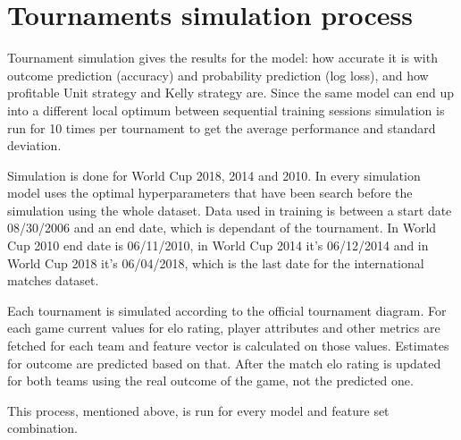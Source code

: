 \section{Tournaments simulation process}
Tournament simulation gives the results for the model: how accurate it is with outcome prediction (accuracy) and probability prediction (log loss), and how profitable Unit strategy and Kelly strategy are. Since the same model can end up into a different local optimum between sequential training sessions simulation is run for 10 times per tournament to get the average performance and standard deviation.

Simulation is done for World Cup 2018, 2014 and 2010. In every simulation model uses the optimal hyperparameters that have been search before the simulation using the whole dataset. Data used in training is between a start date 08/30/2006 and an end date, which is dependant of the tournament. In World Cup 2010 end date is 06/11/2010, in World Cup 2014 it's 06/12/2014 and in World Cup 2018 it's 06/04/2018, which is the last date for the international matches dataset.

Each tournament is simulated according to the official tournament diagram. For each game current values for elo rating, player attributes and other metrics are fetched for each team and feature vector is calculated on those values. Estimates for outcome are predicted based on that. After the match elo rating is updated for both teams using the real outcome of the game, not the predicted one.

This process, mentioned above, is run for every model and feature set combination.